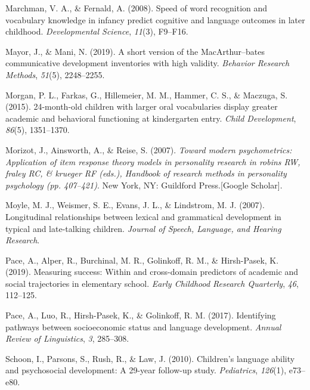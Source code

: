 \documentclass[
  man,floatsintext]{apa6}
\newlength{\cslhangindent}
\newlength{\cslentryspacingunit} %
\newenvironment{CSLReferences}[2] %
 {%
  \setlength{\parindent}{0pt}
  \ifodd #1
  \let\oldpar\par
  \def\par{\hangindent=\cslhangindent\oldpar}
  \fi
  \setlength{\parskip}{#2\cslentryspacingunit}
 }%
 {}
\begin{document}
\begin{CSLReferences}{1}{0}
\leavevmode{}%
Marchman, V. A., \& Fernald, A. (2008). Speed of word recognition and vocabulary knowledge in infancy predict cognitive and language outcomes in later childhood. \emph{Developmental Science}, \emph{11}(3), F9--F16.

\leavevmode{}%
Mayor, J., \& Mani, N. (2019). A short version of the MacArthur--bates communicative development inventories with high validity. \emph{Behavior Research Methods}, \emph{51}(5), 2248--2255.

\leavevmode{}%
Morgan, P. L., Farkas, G., Hillemeier, M. M., Hammer, C. S., \& Maczuga, S. (2015). 24-month-old children with larger oral vocabularies display greater academic and behavioral functioning at kindergarten entry. \emph{Child Development}, \emph{86}(5), 1351--1370.

\leavevmode{}%
Morizot, J., Ainsworth, A., \& Reise, S. (2007). \emph{Toward modern psychometrics: Application of item response theory models in personality research in robins RW, fraley RC, \& krueger RF (eds.), Handbook of research methods in personality psychology (pp. 407--421)}. New York, NY: Guildford Press.{[}Google Scholar{]}.

\leavevmode{}%
Moyle, M. J., Weismer, S. E., Evans, J. L., \& Lindstrom, M. J. (2007). Longitudinal relationships between lexical and grammatical development in typical and late-talking children. \emph{Journal of Speech, Language, and Hearing Research}.

\leavevmode{}%
Pace, A., Alper, R., Burchinal, M. R., Golinkoff, R. M., \& Hirsh-Pasek, K. (2019). Measuring success: Within and cross-domain predictors of academic and social trajectories in elementary school. \emph{Early Childhood Research Quarterly}, \emph{46}, 112--125.

\leavevmode{}%
Pace, A., Luo, R., Hirsh-Pasek, K., \& Golinkoff, R. M. (2017). Identifying pathways between socioeconomic status and language development. \emph{Annual Review of Linguistics}, \emph{3}, 285--308.

\leavevmode{}%
Schoon, I., Parsons, S., Rush, R., \& Law, J. (2010). Children's language ability and psychosocial development: A 29-year follow-up study. \emph{Pediatrics}, \emph{126}(1), e73--e80.


\end{CSLReferences}
\end{document}
